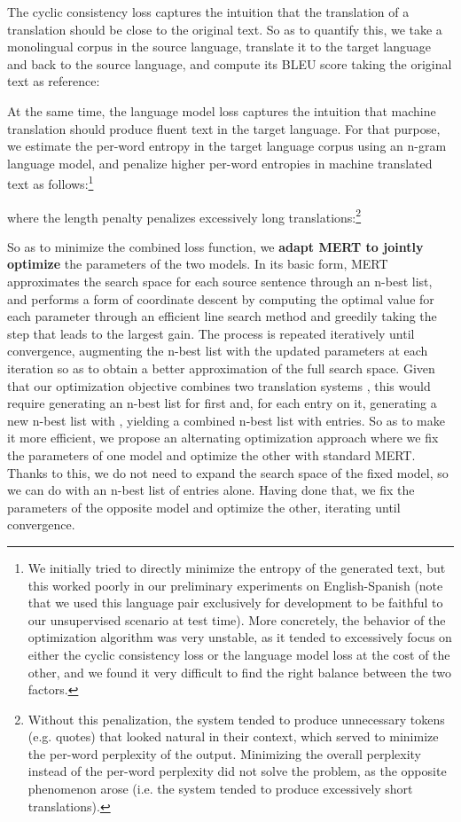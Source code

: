 \documentclass[11pt,a4paper]{article}
\begin{document}
The cyclic consistency loss captures the intuition that the translation of a translation should be close to the original text. So as to quantify this, we take a monolingual corpus in the source language, translate it to the target language and back to the source language, and compute its BLEU score taking the original text as reference:


At the same time, the language model loss captures the intuition that machine translation should produce fluent text in the target language. For that purpose, we estimate the per-word entropy in the target language corpus using an n-gram language model, and penalize higher per-word entropies in machine translated text as follows:\footnote{We initially tried to directly minimize the entropy of the generated text, but this worked poorly in our preliminary experiments on English-Spanish (note that we used this language pair exclusively for development to be faithful to our unsupervised scenario at test time). More concretely, the behavior of the optimization algorithm was very unstable, as it tended to excessively focus on either the cyclic consistency loss or the language model loss at the cost of the other, and we found it very difficult to find the right balance between the two factors.}

where the length penalty  penalizes excessively long translations:\footnote{Without this penalization, the system tended to produce unnecessary tokens (e.g. quotes) that looked natural in their context, which served to minimize the per-word perplexity of the output. Minimizing the overall perplexity instead of the per-word perplexity did not solve the problem, as the opposite phenomenon arose (i.e. the system tended to produce excessively short translations).}


So as to minimize the combined loss function, we \textbf{adapt MERT to jointly optimize} the parameters of the two models. In its basic form, MERT approximates the search space for each source sentence through an n-best list, and performs a form of coordinate descent by computing the optimal value for each parameter through an efficient line search method and greedily taking the step that leads to the largest gain. The process is repeated iteratively until convergence, augmenting the n-best list with the updated parameters at each iteration so as to obtain a better approximation of the full search space.
Given that our optimization objective combines two translation systems , this would require generating an n-best list for  first and, for each entry on it, generating a new n-best list with , yielding a combined n-best list with  entries. So as to make it more efficient, we propose an alternating optimization approach where we fix the parameters of one model and optimize the other with standard MERT. Thanks to this, we do not need to expand the search space of the fixed model, so we can do with an n-best list of  entries alone. Having done that, we fix the parameters of the opposite model and optimize the other, iterating until convergence.
\end{document}
